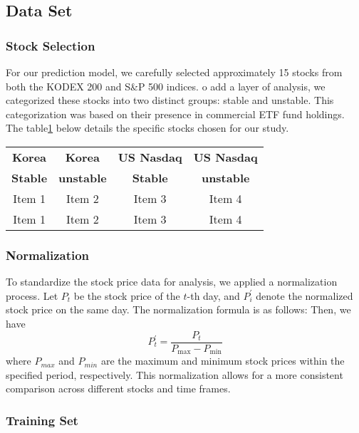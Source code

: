 \subsection{Data Set}
\subsubsection{Stock Selection}

For our prediction model, we carefully selected approximately 15 stocks from both the KODEX 200 and S\&P 500 indices. 
o add a layer of analysis, we categorized these stocks into two distinct groups: stable and unstable. 
This categorization was based on their presence in commercial ETF fund holdings. 
The table\ref{tab:example} below details the specific stocks chosen for our study.

\begin{table}[h]
	\label{tab:example}

	\centering
	\begin{tabular}{cccc}
	\toprule\toprule
	\textbf{Korea} & \textbf{Korea} & \textbf{US Nasdaq} & \textbf{US Nasdaq} \\ 
	\textbf{Stable} & \textbf{unstable} & \textbf{Stable} & \textbf{unstable} \\ 
	\midrule
	Item 1 & Item 2 & Item 3 & Item 4 \\
	Item 1 & Item 2 & Item 3 & Item 4\\
	\bottomrule
	\end{tabular}
\end{table}

\subsubsection{Normalization}

To standardize the stock price data for analysis, we applied a normalization process. Let $P_{t}$ be the stock price of the $t$-th day, and $P_{i}^{\prime}$ denote the normalized stock price on the same day. The normalization formula is as follows:
Then, we have
\begin{equation}
	P_{t}^{\prime} = \frac{P_{t}}{P_{\max} - P_{\min}}
\end{equation}
where $P_{max}$ and $P_{min}$ are the maximum and minimum stock prices within the specified period, respectively. This normalization allows for a more consistent comparison across different stocks and time frames.

\subsubsection{Training Set}

